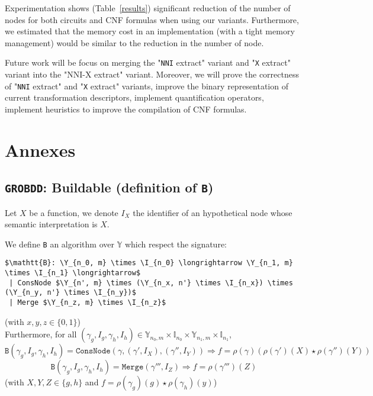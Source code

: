 \documentclass[a4paper,10pt]{article}
\newcommand{\Y}{\mathbb{Y}}
\newcommand{\I}{\mathbb{I}}
\newcommand{\nniextract}{"\texttt{NNI} extract"}
\newcommand{\xextract}{"\texttt{X} extract"}
\newcommand{\GroBdd}{\texttt{GROBDD}}
\begin{document}
Experimentation shows (Table~\ref{results}) significant reduction of the number of nodes for both circuits \cite{BenchSatlib, BenchLgsynth91} and CNF formulas \cite{BenchIscas99} when using our variants.
Furthermore, we estimated that the memory cost in an implementation (with a tight memory management) would be similar to the reduction in the number of node.

Future work will be focus on merging the \nniextract{} variant and \xextract{} variant into the "NNI-X extract" variant.
Moreover, we will prove the correctness of \nniextract{} and \xextract{} variants, improve the binary representation of current transformation descriptors, implement quantification operators, implement heuristics to improve the compilation of CNF formulas.


\newpage
{}


\newpage
\tableofcontents

\newpage

\section{Annexes}

\subsection{\GroBdd{}: Buildable (definition of \texttt{B})\label{grobdd-B-constraints}}

Let $X$ be a function, we denote $I_X$ the identifier of an hypothetical node whose semantic interpretation is $X$.

We define \texttt{B} an algorithm over $\Y$ which respect the signature: 
\begin{lstlisting}
$\mathtt{B}: \Y_{n_0, m} \times \I_{n_0} \longrightarrow \Y_{n_1, m} \times \I_{n_1} \longrightarrow$
 | ConsNode $\Y_{n', m} \times (\Y_{n_x, n'} \times \I_{n_x}) \times (\Y_{n_y, n'} \times \I_{n_y})$
 | Merge $\Y_{n_z, m} \times \I_{n_z}$
\end{lstlisting}
(with $x, y, z \in \{0, 1\}$) \\
Furthermore, for all $(\gamma_g, I_g, \gamma_h, I_h) \in \Y_{n_0, m} \times \I_{n_0} \times \Y_{n_1, m} \times \I_{n_1}$, 
\[ \texttt{B}(\gamma_g, I_g, \gamma_h, I_h) = \texttt{ConsNode} (\gamma, (\gamma', I_X), (\gamma'', I_Y)) \Rightarrow f = \rho\left(\gamma\right) \left(\rho\left(\gamma'\right)(X) \star \rho\left(\gamma''\right)(Y)\right)\]
\[ \texttt{B}(\gamma_g, I_g, \gamma_h, I_h) = \texttt{Merge} (\gamma''', I_Z) \Rightarrow f = \rho(\gamma''')(Z) \]
(with $X, Y, Z \in\{g, h\}$ and $f = \rho(\gamma_g)(g) \star \rho(\gamma_h)(y)$)
\end{document}
